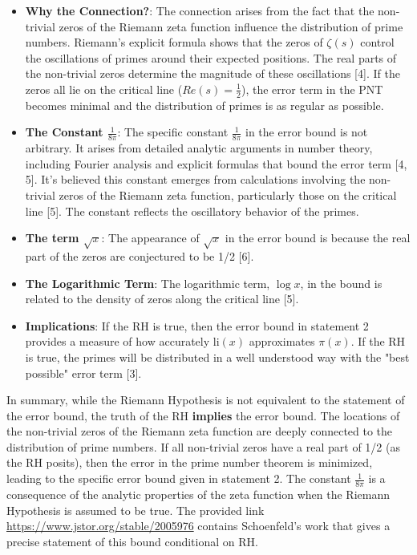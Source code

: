 \documentclass{article}
\begin{document}
\begin{itemize}
     \item  \textbf{Why the Connection?}: The connection arises from the fact that the non-trivial zeros of the Riemann zeta function influence the distribution of prime numbers. Riemann's explicit formula shows that the zeros of \( \zeta(s) \) control the oscillations of primes around their expected positions.  The real parts of the non-trivial zeros determine the magnitude of these oscillations [4]. If the zeros all lie on the critical line (\(Re(s) = \frac{1}{2}\)), the error term in the PNT becomes minimal and the distribution of primes is as regular as possible.
    
    \item \textbf{The Constant \(\frac{1}{8\pi}\)}: The specific constant \( \frac{1}{8\pi} \) in the error bound is not arbitrary. It arises from detailed analytic arguments in number theory, including Fourier analysis and explicit formulas that bound the error term [4, 5]. It's believed this constant emerges from calculations involving the non-trivial zeros of the Riemann zeta function, particularly those on the critical line [5]. The constant reflects the oscillatory behavior of the primes.
   
    \item \textbf{The term \(\sqrt{x}\)}:  The appearance of \( \sqrt{x} \) in the error bound is because the real part of the zeros are conjectured to be 1/2 [6].

   \item \textbf{The Logarithmic Term}: The logarithmic term,  \(\log x\), in the bound is related to the density of zeros along the critical line [5].

   \item \textbf{Implications}:  If the RH is true, then the error bound in statement 2 provides a measure of how accurately \( \text{li}(x) \) approximates \( \pi(x) \). If the RH is true, the primes will be distributed in a well understood way with the "best possible" error term [3].
    
\end{itemize}

In summary, while the Riemann Hypothesis is not equivalent to the statement of the error bound, the truth of the RH \textbf{implies} the error bound.  The locations of the non-trivial zeros of the Riemann zeta function are deeply connected to the distribution of prime numbers. If all non-trivial zeros have a real part of 1/2 (as the RH posits), then the error in the prime number theorem is minimized, leading to the specific error bound given in statement 2. The constant \( \frac{1}{8\pi} \) is a consequence of the analytic properties of the zeta function when the Riemann Hypothesis is assumed to be true. The provided link \url{https://www.jstor.org/stable/2005976} contains Schoenfeld's work that gives a precise statement of this bound conditional on RH.
\end{document}
